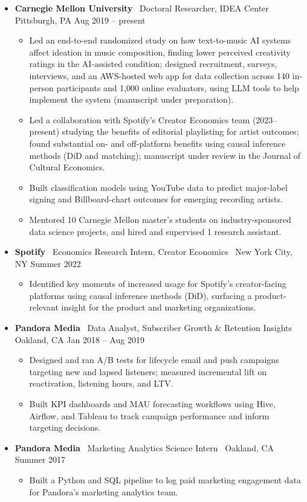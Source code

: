 \documentclass[10pt,letterpaper]{article}
\newcommand{\sep}{{\color{gray}\,\textbullet\,\,}}
\begin{document}
\begin{itemize}[leftmargin=0pt, label={}, itemsep=4pt]
\item \textbf{Carnegie Mellon University} \sep Doctoral Researcher, IDEA Center \sep Pittsburgh, PA \hfill Aug 2019 -- present
  \begin{itemize}
  \item Led an end-to-end randomized study on how text-to-music AI systems affect ideation in music composition, finding lower perceived creativity ratings in the AI-assisted condition; designed recruitment, surveys, interviews, and an AWS-hosted web app for data collection across 140 in-person participants and 1{,}000 online evaluators, using LLM tools to help implement the system (manuscript under preparation).
  \item Led a collaboration with Spotify's Creator Economics team (2023--present) studying the benefits of editorial playlisting for artist outcomes; found substantial on- and off-platform benefits using causal inference methods (DiD and matching); manuscript under review in the Journal of Cultural Economics.
  \item Built classification models using YouTube data to predict major-label signing and Billboard-chart outcomes for emerging recording artists.
  \item Mentored 10 Carnegie Mellon master's students on industry-sponsored data science projects, and hired and supervised 1 research assistant.
  \end{itemize}
\item \textbf{Spotify} \sep Economics Research Intern, Creator Economics \sep New York City, NY \hfill Summer 2022
  \begin{itemize}
  \item Identified key moments of increased usage for Spotify's creator-facing platforms using causal inference methods (DiD), surfacing a product-relevant insight for the product and marketing organizations.
  \end{itemize}
\item \textbf{Pandora Media} \sep Data Analyst, Subscriber Growth \& Retention Insights \sep Oakland, CA \hfill Jan 2018 -- Aug 2019
  \begin{itemize}
  \item Designed and ran A/B tests for lifecycle email and push campaigns targeting new and lapsed listeners; measured incremental lift on reactivation, listening hours, and LTV.
  \item Built KPI dashboards and MAU forecasting workflows using Hive, Airflow, and Tableau to track campaign performance and inform targeting decisions.
  \end{itemize}
\item \textbf{Pandora Media} \sep Marketing Analytics Science Intern \sep Oakland, CA \hfill Summer 2017
  \begin{itemize}
  \item Built a Python and SQL pipeline to log paid marketing engagement data for Pandora's marketing analytics team.
  \end{itemize}
\end{itemize}
\end{document}
